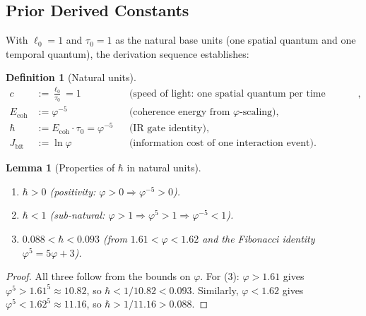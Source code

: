 \documentclass[12pt]{article}
\newtheorem{lemma}[theorem]{Lemma}
\theoremstyle{definition}
\newtheorem{definition}[theorem]{Definition}
\theoremstyle{remark}
\begin{document}
\subsection{Prior Derived Constants}
\label{sec:prior-constants}

With $\ell_0 = 1$ and $\tau_0 = 1$ as the natural base units
(one spatial quantum and one temporal quantum), the derivation
sequence establishes:

\begin{definition}[Natural units]
\label{def:RS-constants}
\begin{align}
  c &:= \frac{\ell_0}{\tau_0} = 1
    &&\text{(speed of light: one spatial quantum per time quantum)},
    \label{eq:c-def}
  \\[4pt]
  E_{\mathrm{coh}} &:= \varphi^{-5}
    &&\text{(coherence energy from $\varphi$-scaling)},
    \label{eq:Ecoh-def}
  \\[4pt]
  \hbar &:= E_{\mathrm{coh}} \cdot \tau_0 = \varphi^{-5}
    &&\text{(IR gate identity)},
    \label{eq:hbar-def}
  \\[4pt]
  J_{\mathrm{bit}} &:= \ln\varphi
    &&\text{(information cost of one interaction event)}.
    \label{eq:Jbit-def}
\end{align}
\end{definition}

\begin{lemma}[Properties of $\hbar$ in natural units]
\begin{enumerate}
  \item $\hbar > 0$ (positivity: $\varphi > 0 \Longrightarrow
    \varphi^{-5} > 0$).
  \item $\hbar < 1$ (sub-natural: $\varphi > 1 \Longrightarrow
    \varphi^5 > 1 \Longrightarrow \varphi^{-5} < 1$).
  \item $0.088 < \hbar < 0.093$ (from $1.61 < \varphi < 1.62$ and the
    Fibonacci identity $\varphi^5 = 5\varphi + 3$).
\end{enumerate}
\end{lemma}

\begin{proof}
All three follow from the bounds on $\varphi$. For (3): $\varphi >
1.61$ gives $\varphi^5 > 1.61^5 \approx 10.82$, so $\hbar <
1/10.82 < 0.093$. Similarly, $\varphi < 1.62$ gives $\varphi^5 <
1.62^5 \approx 11.16$, so $\hbar > 1/11.16 > 0.088$.
\end{proof}

\end{document}
